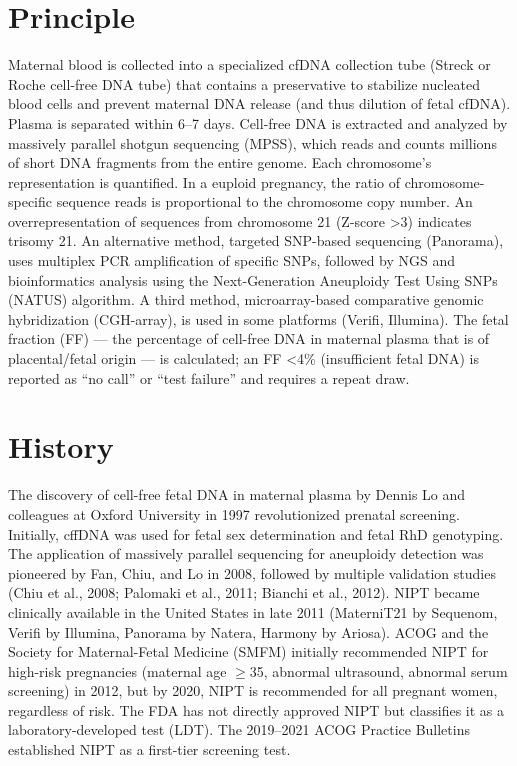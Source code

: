 \section*{Principle}
Maternal blood is collected into a specialized cfDNA collection tube (Streck or Roche cell-free DNA tube) that contains a preservative to stabilize nucleated blood cells and prevent maternal DNA release (and thus dilution of fetal cfDNA). Plasma is separated within 6--7 days. Cell-free DNA is extracted and analyzed by massively parallel shotgun sequencing (MPSS), which reads and counts millions of short DNA fragments from the entire genome. Each chromosome's representation is quantified. In a euploid pregnancy, the ratio of chromosome-specific sequence reads is proportional to the chromosome copy number. An overrepresentation of sequences from chromosome 21 (Z-score >3) indicates trisomy 21. An alternative method, targeted SNP-based sequencing (Panorama), uses multiplex PCR amplification of specific SNPs, followed by NGS and bioinformatics analysis using the Next-Generation Aneuploidy Test Using SNPs (NATUS) algorithm. A third method, microarray-based comparative genomic hybridization (CGH-array), is used in some platforms (Verifi, Illumina). The fetal fraction (FF) --- the percentage of cell-free DNA in maternal plasma that is of placental/fetal origin --- is calculated; an FF <4\% (insufficient fetal DNA) is reported as ``no call'' or ``test failure'' and requires a repeat draw.

\section*{History}
The discovery of cell-free fetal DNA in maternal plasma by Dennis Lo and colleagues at Oxford University in 1997 revolutionized prenatal screening. Initially, cffDNA was used for fetal sex determination and fetal RhD genotyping. The application of massively parallel sequencing for aneuploidy detection was pioneered by Fan, Chiu, and Lo in 2008, followed by multiple validation studies (Chiu et al., 2008; Palomaki et al., 2011; Bianchi et al., 2012). NIPT became clinically available in the United States in late 2011 (MaterniT21 by Sequenom, Verifi by Illumina, Panorama by Natera, Harmony by Ariosa). ACOG and the Society for Maternal-Fetal Medicine (SMFM) initially recommended NIPT for high-risk pregnancies (maternal age $\geq$35, abnormal ultrasound, abnormal serum screening) in 2012, but by 2020, NIPT is recommended for all pregnant women, regardless of risk. The FDA has not directly approved NIPT but classifies it as a laboratory-developed test (LDT). The 2019--2021 ACOG Practice Bulletins established NIPT as a first-tier screening test.

